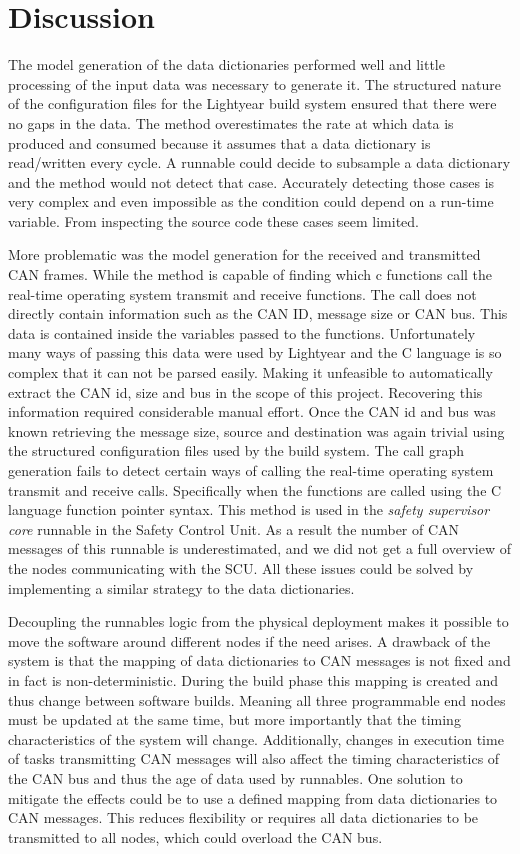 \section{Discussion}
\label{sec:discussion}
The model generation of the data dictionaries performed well and little processing of the input data was necessary to generate it. The structured nature of the configuration files for the Lightyear build system ensured that there were no gaps in the data. The method overestimates the rate at which data is produced and consumed because it assumes that a data dictionary is read/written every cycle. A runnable could decide to subsample a data dictionary and the method would not detect that case. Accurately detecting those cases is very complex and even impossible as the condition could depend on a run-time variable. From inspecting the source code these cases seem limited. 

More problematic was the model generation for the received and transmitted CAN frames. While the method is capable of finding which c functions call the real-time operating system transmit and receive functions. The call does not directly contain information such as the CAN ID, message size or CAN bus. This data is contained inside the variables passed to the functions. Unfortunately many ways of passing this data were used by Lightyear and the C language is so complex that it can not be parsed easily. Making it unfeasible to automatically extract the CAN id, size and bus in the scope of this project. Recovering this information required considerable manual effort. Once the CAN id and bus was known retrieving the message size, source and destination was again trivial using the structured configuration files used by the build system. The call graph generation fails to detect certain ways of calling the real-time operating system transmit and receive calls. Specifically when the functions are called using the C language function pointer syntax. This method is used in the \textit{safety supervisor core} runnable in the Safety Control Unit. As a result the number of CAN messages of this runnable is underestimated, and we did not get a full overview of the nodes communicating with the SCU. All these issues could be solved by implementing a similar strategy to the data dictionaries.

Decoupling the runnables logic from the physical deployment makes it possible to move the software around different nodes if the need arises. A drawback of the system is that the mapping of data dictionaries to CAN messages is not fixed and in fact is non-deterministic. During the build phase this mapping is created and thus change between software builds. Meaning all three programmable end nodes must be updated at the same time, but more importantly that the timing characteristics of the system will change. Additionally, changes in execution time of tasks transmitting CAN messages will also affect the timing characteristics of the CAN bus and thus the age of data used by runnables. One solution to mitigate the effects could be to use a defined mapping from data dictionaries to CAN messages. This reduces flexibility or requires all data dictionaries to be transmitted to all nodes, which could overload the CAN bus. 

